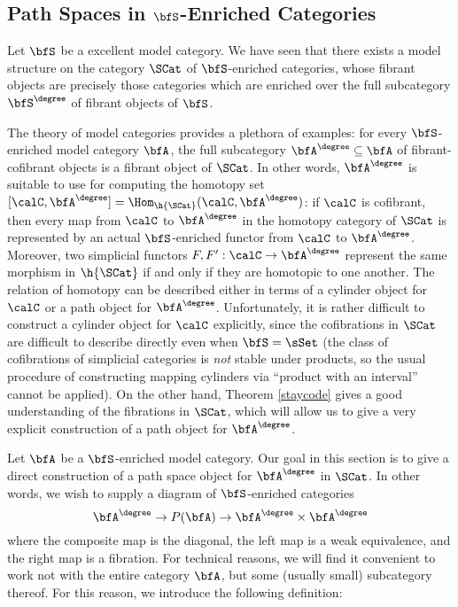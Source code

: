 \subsection{Path Spaces in $\bfS$-Enriched Categories}\label{pathspace}

Let $\bfS$ be a excellent model category. We have seen that there exists a model structure on the category $\SCat$ of $\bfS$-enriched categories, whose fibrant objects are precisely
those categories which are enriched over the full subcategory $\bfS^{\degree}$ of fibrant
objects of $\bfS$. 

The theory of model categories provides a plethora of examples:
for every $\bfS$-enriched model category $\bfA$, the full subcategory $\bfA^{\degree} \subseteq \bfA$ of fibrant-cofibrant objects is a fibrant object of $\SCat$.
In other words, $\bfA^{\degree}$ is suitable to use for computing the homotopy set $[\calC, \bfA^{\degree}] = \Hom_{ \h{\SCat} }( \calC, \bfA^{\degree})$: if $\calC$ is cofibrant, then every map from $\calC$ to $\bfA^{\degree}$ in the homotopy category of $\SCat$ is represented by an actual $\bfS$-enriched functor from $\calC$ to $\bfA^{\degree}$. Moreover, two simplicial functors $F,F': \calC \rightarrow \bfA^{\degree}$ represent the same morphism
in $\h{\SCat}$ if and only if they are homotopic to one another. The relation of homotopy can be described either in terms of a cylinder object for $\calC$ or a path object for $\bfA^{\degree}$. Unfortunately, it is rather difficult to construct a cylinder object for $\calC$ explicitly, since the cofibrations in $\SCat$ are difficult to describe directly even when $\bfS = \sSet$ (the class of cofibrations of simplicial categories is {\em not} stable under products, so the usual procedure of
constructing mapping cylinders via ``product with an interval'' cannot be applied). 
On the other hand, Theorem \ref{staycode} gives a good understanding of the fibrations
in $\SCat$, which will allow us to give a very explicit construction of a path object for $\bfA^{\degree}$.

Let $\bfA$ be a $\bfS$-enriched model category. Our goal in this section is to give a direct construction of a path space object for $\bfA^{\degree}$ in $\SCat$. In other words, we wish to supply
a diagram of $\bfS$-enriched categories $$\bfA^{\degree} \rightarrow P( \bfA )
\rightarrow \bfA^{\degree} \times \bfA^{\degree}$$
where the composite map is the diagonal, the left map is a weak equivalence, and the right map is a fibration. For technical reasons, we will find it convenient to work not with the entire
category $\bfA$, but some (usually small) subcategory thereof. For this reason, we
introduce the following definition:

